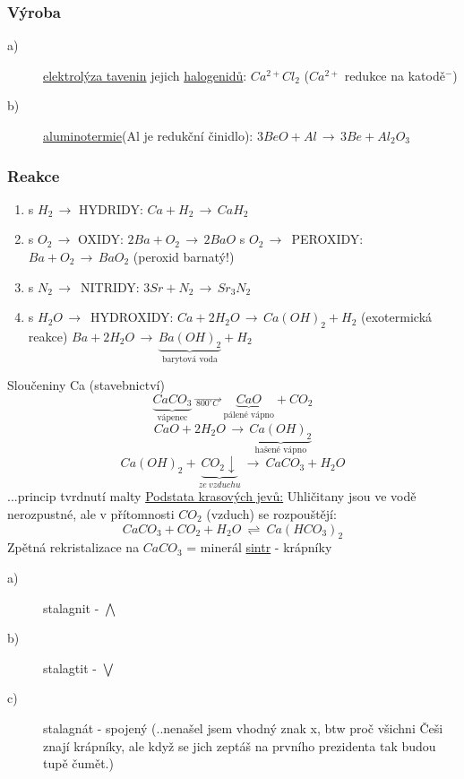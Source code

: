 \documentclass{article}
\def\WATER{H_2O}
\begin{document}
    \subsubsection{Výroba}
        \begin{description}
            \item[a)] \underline{elektrolýza tavenin} jejich \underline{halogenidů}: \textbf{\(Ca^{2+}Cl_2\)} ($Ca^{2+}$ redukce na katodě$^-$)
            \item[b)] \underline{aluminotermie}(Al je redukční činidlo): \(3BeO + Al \,\to\, 3Be + Al_2 O_3\)
        \end{description}
    \subsubsection{Reakce}
    \begin{enumerate}
        \item s $H_2 \,\to$ HYDRIDY: \tab $Ca + H_2 \,\to\, CaH_2$
        \item s $O_2 \,\to$ OXIDY: \tab $2Ba + O_2 \,\to\, 2BaO$
            \newline s $O_2 \,\to\,$ PEROXIDY: \tab $Ba + O_2 \,\to\, BaO_2$ (peroxid barnatý!)
        \item s $N_2 \,\to\,$ NITRIDY: \tab $3Sr + N_2 \,\to\, Sr_3 N_2$
        \item s $\WATER \,\to\,$ HYDROXIDY: \tab $Ca+2\WATER \,\to\, Ca \left( OH \right) _2 + H_2$ (exotermická reakce)
            \newline \tab\tab $Ba + 2\WATER \,\to\, \underbrace{Ba \left( OH \right) _2}_\text{barytová voda} + H_2$ 
    \end{enumerate}
    Sloučeniny Ca (stavebnictví)
    \[\underbrace{CaCO_3}_\text{vápenec} \,\overrightarrow{\, _{800^\circ C} \,} \, \underbrace{CaO}_\text{pálené vápno} + CO_2\]
    \newline
    \[CaO + 2\WATER \,\to\, \underbrace{Ca \left(OH\right)_2}_\text{hašené vápno}\]
    \newline
    \[Ca\left(OH\right)_2 + \underbrace{CO_2 \downarrow}_{ze~vzduchu} ~\to~ CaCO_3 + \WATER\] ...princip tvrdnutí malty
    \newline \newline
    \underline{Podstata krasových jevů:} Uhličitany jsou ve vodě nerozpustné, ale v přítomnosti $CO_2$ (vzduch) se rozpouštějí:
    \[CaCO_3 + CO_2 + \WATER ~\rightleftharpoons ~ Ca \left( HCO_3 \right)_2 \]
    Zpětná rekristalizace na $CaCO_3$ = minerál \underline{sintr} - krápníky
    \begin{description}
        \item[a)] stalagnit - $\bigwedge$
        \item[b)] stalagtit - $\bigvee$
        \item[c)] stalagnát - spojený \tiny{(..nenašel jsem vhodný znak x, btw proč všichni Češi znají krápníky, ale když se jich zeptáš na prvního prezidenta tak budou tupě čumět.)}
    \end{description}
\end{document}
